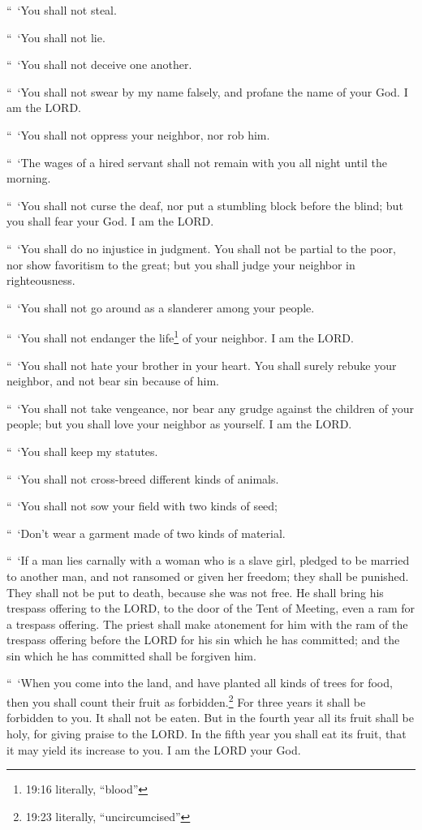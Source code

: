 \myverse{}“ ‘You shall not steal.

“ ‘You shall not lie.

“ ‘You shall not deceive one another.


\myverse{}“ ‘You shall not swear by my name falsely, and profane the name
of your God. I am the LORD.


\myverse{}“ ‘You shall not oppress your neighbor, nor rob him.

“ ‘The wages of a hired servant shall not remain with you all night until the morning.


\myverse{}“ ‘You shall not curse the deaf, nor put a stumbling block before
the blind; but you shall fear your God. I am the LORD.


\myverse{}“ ‘You shall do no injustice in judgment. You shall not be partial
to the poor, nor show favoritism to the great; but you shall judge your neighbor in righteousness.


\myverse{}“ ‘You shall not go around as a slanderer among your people.

“ ‘You shall not endanger the life\footnote{19:16 literally, “blood”} of your neighbor. I am the LORD.


\myverse{}“ ‘You shall not hate your brother in your heart. You shall surely
rebuke your neighbor, and not bear sin because of him.


\myverse{}“ ‘You shall not take vengeance, nor bear any grudge against
the children of your people; but you shall love your neighbor as yourself. I am the LORD.


\myverse{}“ ‘You shall keep my statutes.

“ ‘You shall not cross-breed different kinds of animals.

“ ‘You shall not sow your field with two kinds of seed;

“ ‘Don’t wear a garment made of two kinds of material.


\myverse{}“ ‘If a man lies carnally with a woman who is a slave girl, pledged
to be married to another man, and not ransomed or given her freedom; they shall be punished. They shall
not be put to death, because she was not free.
\myverse{}He shall bring his trespass offering to the LORD, to the door of the Tent
of Meeting, even a ram for a trespass offering.
\myverse{}The priest shall make atonement for him with the ram of the trespass offering
before the LORD for his sin which he has committed; and the sin which he has committed shall be forgiven
him.


\myverse{}“ ‘When you come into the land, and have planted all kinds of
trees for food, then you shall count their fruit as forbidden.\footnote{19:23 literally, “uncircumcised”} For three years it shall be forbidden to you. It shall not
be eaten.
\myverse{}But in the fourth year all its fruit shall be holy, for giving praise to
the LORD.
\myverse{}In the fifth year you shall eat its fruit, that it may yield its increase
to you. I am the LORD your God.


